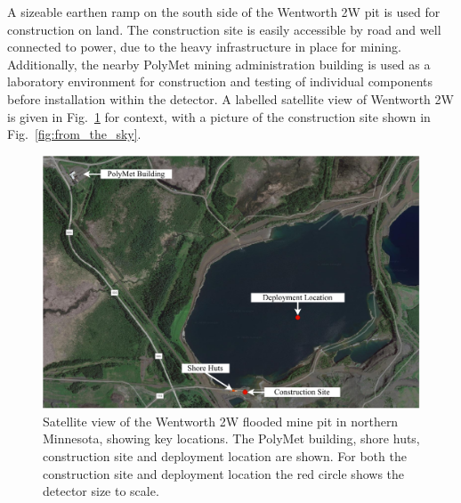 A sizeable earthen ramp on the south side of the Wentworth 2W pit is used for construction on
land. The construction site is easily accessible by road and well connected to power, due to the
heavy infrastructure in place for mining. Additionally, the nearby PolyMet mining administration
building is used as a laboratory environment for construction and testing of individual components
before installation within the detector. A labelled satellite view of Wentworth 2W is given in
Fig.~\ref{fig:pit} for context, with a picture of the construction site shown in
Fig.~\ref{fig:from_the_sky}.

\begin{figure} %
    \includegraphics[width=\textwidth]{diagrams/4-chips/pit.pdf}
    \caption[Satellite view of the Wentworth 2W mine pit, with key locations.]
    {Satellite view of the Wentworth 2W flooded mine pit in northern Minnesota, showing key
        \chipsfive locations. The PolyMet building, shore huts, construction site and deployment
        location are shown. For both the construction site and deployment location the red circle
        shows the \chipsfive detector size to scale.}
    \label{fig:pit}
\end{figure}

